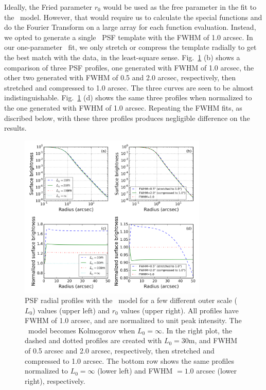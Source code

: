 Ideally, the Fried parameter $r_0$ would be used as the free
parameter in the fit to the \vk~model. However, 
that would require us to calculate the special functions and do the
Fourier Transform on a large array for each function evaluation.
Instead, we opted to generate a single \vk~PSF template with the FWHM of 
1.0 arcsec. In our one-parameter \vk~fit, we only stretch or compress
the template radially to get the best match with the data, in the
least-square sense.
Fig.~\ref{fig:vonK} (b) shows a comparison of three PSF profiles,
one generated with FWHM of 1.0 arcsec, the other two generated with
FWHM of 0.5 and 2.0 arcsec, respectively, then stretched and
compressed to 1.0 arcsec. The three curves are seen to be almost
indistinguishable.
Fig.~\ref{fig:vonK} (d) shows the same three profiles when normalized
to the one generated with FWHM of 1.0 arcsec.
Repeating the FWHM fits, as discribed below, with these three profiles
produces negligible difference on the results.

\begin{figure}[ht]
\centering
\includegraphics[width=0.8\textwidth]{FIGURES/vonK.png}
\vskip -0.2in 
\caption{PSF radial profiles with the \vk~model for a few different
  outer scale ($L_0$) values (upper left) and $r_0$ values (upper right). 
All profiles have FWHM of 1.0 arcsec, and
  are normalized to unit peak intensity. The \vk~model becomes
  Kolmogorov when $L_0 = \infty$.
In the right plot, the dashed and dotted profiles are created with
$L_0 = 30$m, and 
FWHM of 0.5 arcsec and 2.0 arcsec, respectively, then stretched and
compressed to 1.0 arcsec.
The bottom row shows the same profiles normalized to 
$L_0 = \infty$ (lower left) and FWHM $=1.0$ arcsec (lower right), respectively.
\label{fig:vonK}}
\end{figure}


